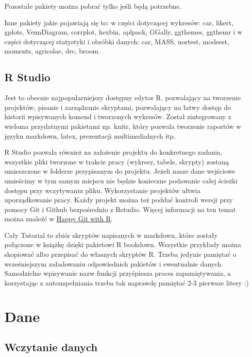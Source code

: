 \documentclass[
]{book}
\begin{document}
Pozostałe pakiety można pobrać tylko jeśli będą potrzebne.

Inne pakiety jakie pojawiają się to: w części dotyczącej wykresów: car, likert, gplots, VennDiagram, corrplot, hexbin, aplpack, GGally, ggthemes, ggthemr i w części dotyczącej statystyki i obróbki danych: car, MASS, nortest, modeest, moments, agricolae, drc, broom.

\hypertarget{r-studio}{%
\section{R Studio}\label{r-studio}}

Jest to obecnie najpopularniejszy dostępny edytor R, pozwalający na tworzenie projektów, pisanie i zarządzanie skryptami, pozwalający na łatwy dostęp do historii wpisywanych komend i tworzonych wykresów. Został zintegrowany z wieloma przydatnymi pakietami np. knitr, który pozwala tworzenie raportów w języku markdown, latex, prezentacji multimedialnych itp.

R Studio pozwala również na założenie projektu do konkretnego zadania, wszystkie pliki tworzone w trakcie pracy (wykresy, tabele, skrypty) zostaną umieszczone w folderze przypisanym do projektu. Jeżeli nasze dane wejściowe umieścimy w tym samym miejscu nie będzie konieczne podawanie całej ścieżki dostępu przy wczytywaniu pliku. Wykorzystanie projektów ułtwia uporządkowanie pracy. Każdy projekt można też poddać kontroli wersji przy pomocy Git i Github bezpośrednio z Rstudio. Więcej informacji na ten temat można znaleźć w \href{https://happygitwithr.com/}{Happy Git with R}.

Cały Tutorial to zbiór skryptów napisanych w markdown, które zostały połączone w książkę dzięki pakietowi R bookdown. Wszystkie przykłady można skopiować albo przepisać do własnych skryptów R. Trzeba jedynie pamiętać o wcześniejszym załadowaniu odpowiednich pakietów i ewentualnie danych. Samodzielne wpisywanie nazw funkcji przyśpiesza proces zapamiętywania, a korzystając z autouzpełniania trzeba tak naprawdę pamiętać 2-3 pierwsze litery :)

\hypertarget{dane}{%
\chapter{Dane}\label{dane}}

\hypertarget{wczytanie-danych}{%
\section{Wczytanie danych}\label{wczytanie-danych}}
\end{document}
